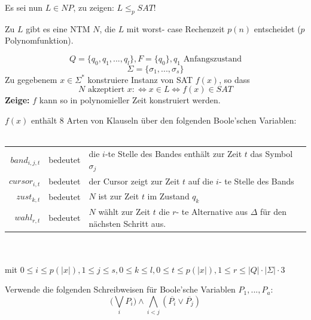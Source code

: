 \documentclass[fleqn]{scrartcl}
\begin{document}
Es sei nun $L \in NP$, zu zeigen: $L \leq_p SAT$!

Zu $L$ gibt es eine NTM $N$, die $L$ mit worst- case Rechenzeit $p(n)$ entscheidet ($p$ Polynomfunktion).

\[Q = \{q_0, q_1, ..., q_l\}, F = \{q_0\}, q_1 \text{ Anfangszustand}\]
\[\Sigma = \{\sigma_1, ..., \sigma_s\}\]
Zu gegebenem $x \in \Sigma^*$ konstruiere Instanz von SAT $f(x)$, so dass
\[N \text{ akzeptiert } x :\Leftrightarrow x \in L \Leftrightarrow f(x) \in SAT\]
\textbf{Zeige:} $f$ kann so in polynomieller Zeit konstruiert werden.

$f(x)$ enthält 8 Arten von Klauseln über den folgenden Boole'schen Variablen:\\\\
\begin{tabular} {r c l}
$band_{i, j, t}$ & bedeutet & die $i$-te Stelle des Bandes enthält zur Zeit $t$ das Symbol $\sigma_j$\\
$cursor_{i, t}$ & bedeutet & der Cursor zeigt zur Zeit $t$ auf die $i$- te Stelle des Bands\\
$zust_{k, t}$ & bedeutet & $N$ ist zur Zeit $t$ im Zustand $q_k$\\
$wahl_{r, t}$ & bedeutet & $N$ wählt zur Zeit $t$ die $r$- te Alternative aus $\Delta$ für den nächsten Schritt aus.
\end{tabular}\\\\
mit $0 \leq i \leq p(|x|), 1 \leq j \leq s, 0 \leq k \leq l, 0 \leq t \leq p(|x|), 1 \leq r \leq |Q| \cdot |\Sigma| \cdot 3$

Verwende die folgenden Schreibweisen für Boole'sche Variablen $P_1, ..., P_a$:
\[\bigg(\underset{i}{\bigvee} P_i\bigg) \land \underset{i < j}{\bigwedge} (\overline{P_i} \lor \overline{P_j})\]
\end{document}
